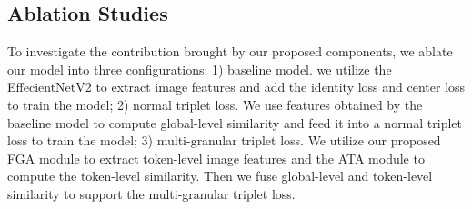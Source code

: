\documentclass[10pt,twocolumn,letterpaper]{article}
\begin{document}
\begin{table}[]
\caption{Ablation studies. We investigate the contribution of proposed modules and report the results on the In-Shop clothes Retrieval dataset.}
\label{tab2}
\end{table}


\subsection{Ablation Studies}
To investigate the contribution brought by our proposed components, we ablate our model into three configurations: 1) baseline model. we utilize the EffecientNetV2 to extract image features and add the identity loss and center loss to train the model; 2) normal triplet loss. We use features obtained by the baseline model to compute global-level similarity and feed it into a normal triplet loss to train the model; 3) multi-granular triplet loss. We utilize our proposed FGA module to extract token-level image features and the ATA module to compute the token-level similarity. Then we fuse global-level and token-level similarity to support the multi-granular triplet loss.
\end{document}
